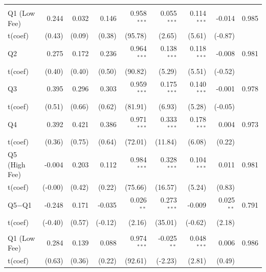 {\begin{longtable}[t]{lrrrrrrrr}
\endfoot
\bottomrule
\endlastfoot
\addlinespace[0.3em]
\multicolumn{9}{l}{Active --- EW}\\
\hspace{1em}Q1 (Low Fee) & 0.244 & 0.032 & 0.146 & 0.958$^{***}$ & 0.055$^{***}$ & 0.114$^{***}$ & -0.014 & 0.985\\
\hspace{1em}t(coef) & (0.43) & (0.09) & (0.38) & (95.78) & (2.65) & (5.61) & (-0.87) & \\
\hspace{1em}Q2 & 0.275 & 0.172 & 0.236 & 0.964$^{***}$ & 0.138$^{***}$ & 0.118$^{***}$ & -0.008 & 0.981\\
\hspace{1em}t(coef) & (0.40) & (0.40) & (0.50) & (90.82) & (5.29) & (5.51) & (-0.52) & \\
\hspace{1em}Q3 & 0.395 & 0.296 & 0.303 & 0.959$^{***}$ & 0.175$^{***}$ & 0.140$^{***}$ & -0.001 & 0.978\\
\hspace{1em}t(coef) & (0.51) & (0.66) & (0.62) & (81.91) & (6.93) & (5.28) & (-0.05) & \\
\hspace{1em}Q4 & 0.392 & 0.421 & 0.386 & 0.971$^{***}$ & 0.333$^{***}$ & 0.178$^{***}$ & 0.004 & 0.973\\
\hspace{1em}t(coef) & (0.36) & (0.75) & (0.64) & (72.01) & (11.84) & (6.08) & (0.22) & \\
\hspace{1em}Q5 (High Fee) & -0.004 & 0.203 & 0.112 & 0.984$^{***}$ & 0.328$^{***}$ & 0.104$^{***}$ & 0.011 & 0.981\\
\hspace{1em}t(coef) & (-0.00) & (0.42) & (0.22) & (75.66) & (16.57) & (5.24) & (0.83) & \\
\hspace{1em}Q5$-$Q1 & -0.248 & 0.171 & -0.035 & 0.026$^{**}$ & 0.273$^{***}$ & -0.009 & 0.025$^{**}$ & 0.791\\
\hspace{1em}t(coef) & (-0.40) & (0.57) & (-0.12) & (2.16) & (35.01) & (-0.62) & (2.18) & \\
\addlinespace[0.3em]
\hline
\multicolumn{9}{l}{Active --- VW}\\
\hspace{1em}Q1 (Low Fee) & 0.284 & 0.139 & 0.088 & 0.974$^{***}$ & -0.025$^{**}$ & 0.048$^{***}$ & 0.006 & 0.986\\
\hspace{1em}t(coef) & (0.63) & (0.36) & (0.22) & (92.61) & (-2.23) & (2.81) & (0.49) & \\

\end{longtable}}
